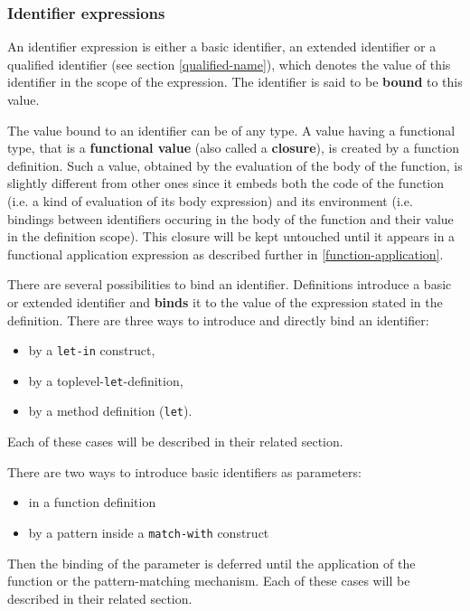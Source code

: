 \subsubsection{Identifier expressions}
\label{identifier-expressions}


An identifier expression is either a basic identifier, an extended
identifier or a qualified identifier (see section
\ref{qualified-name}), which denotes the value of this identifier in
the scope of the expression. The identifier is said to be {\bf bound}
to this value.

The value bound to an identifier can be of any type. A value having a
functional type, that is a {\bf functional
  value}\label{functional-value} (also called a
{\bf closure}), is created by a function definition. Such a value,
obtained by the evaluation of the body of the function, is slightly
different from other ones since it embeds both the code of the
function (i.e. a kind of evaluation of its body expression) and its
environment (i.e. bindings between identifiers occuring in the body of
the function and their value in the definition scope). This closure
will be kept untouched until it appears in a functional application
expression as described further in \ref{function-application}.

There are several possibilities to bind an identifier.  Definitions
introduce a basic or extended identifier and {\bf binds} it to the
value of the expression stated in the definition.  There are three
ways to introduce and directly bind an identifier:
\begin{itemize}
  \item by a {\tt let-in} construct,
  \item by a toplevel-{\tt let}-definition,
  \item by a method definition ({\tt let}).
 \end{itemize}
 Each of these cases will
be described in their related section.


There are two ways to introduce basic identifiers as parameters:
\begin{itemize}
\item in a function definition
 \item by a pattern inside a {\tt match-with} construct
\end{itemize}
Then the binding of the parameter is deferred until the application of
the function or the pattern-matching mechanism.
 Each of these cases will
be described in their related section.


